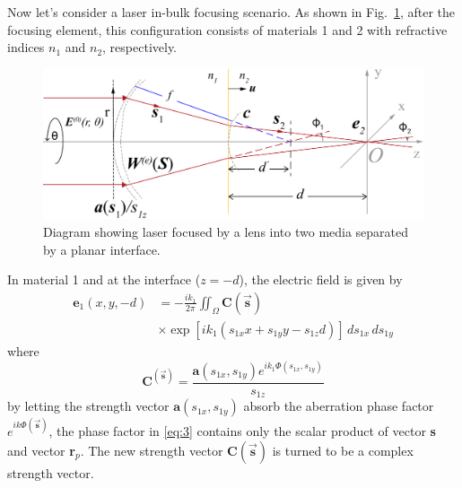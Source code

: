 \documentclass[9pt,twocolumn,twoside]{osajnl}
\begin{document}
Now let's consider a laser in-bulk focusing scenario. As shown in Fig.~\ref{fig:1}, after the focusing element, this configuration consists of materials 1 and 2 with refractive indices $n_1$ and $n_2$, respectively.

\begin{figure}
	\centering
	\includegraphics[width=\linewidth]{../AppOptics/figures/vectorDiffractionTheory.pdf}
	\caption{Diagram showing laser focused by a lens into two media separated by a planar interface.}\label{fig:1}
\end{figure}

In material 1 and at the interface ($z=-d$), the electric field is given by
\begin{equation}\label{eq:3}
	\begin{aligned}
		\textbf{e}_1(x,y,-d)&=-\frac{ik_1}{2\pi}\iint_\Omega\textbf{C}(\vec{\mathbf{s}})\\
	&\times\exp[ik_1(s_{1x}x+s_{1y}y-s_{1z}d)]\,ds_{1x}\,ds_{1y}	
	\end{aligned}
\end{equation}
where 
\begin{equation}
	\textbf{C}^(\vec{\mathbf{s}})=\frac{\textbf{a}(s_{1x},s_{1y})e^{ik_1\Phi(s_{1x},s_{1y})}}{s_{1z}}
\end{equation}\label{eq:4}
by letting the strength vector $\mathbf{a}(s_{1x},s_{1y})$ absorb the aberration phase factor $e^{ik\Phi(\vec{\mathbf{s}})}$, the phase factor in \eqref{eq:3} contains only the scalar product of vector \textbf{s} and vector \textbf{r}$_p$. The new strength vector $\textbf{C}(\vec{\mathbf{s}})$ is turned to be a complex strength vector.
\end{document}
